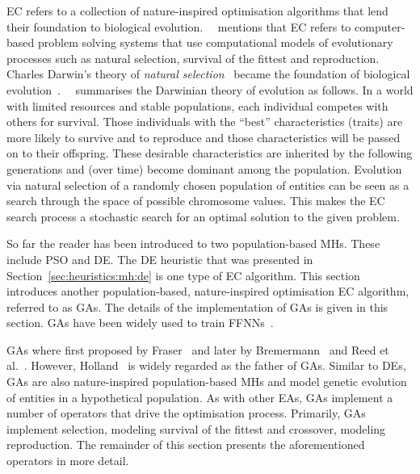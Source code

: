 \Ac{EC} refers to a collection of nature-inspired optimisation algorithms that lend their foundation to biological evolution.~\citeauthor{ref:engelbrecht:2007}~\cite{ref:engelbrecht:2007} mentions that \acs{EC} refers to computer-based problem solving systems that use computational models of evolutionary processes such as natural selection, survival of the fittest and reproduction. Charles Darwin's theory of \textit{natural selection}~\cite{ref:darwin:2012} became the foundation of biological evolution~\cite{ref:darwin:1987}.~\citeauthor{ref:engelbrecht:2007}~\cite{ref:engelbrecht:2007} summarises the Darwinian theory of evolution as follows. In a world with limited resources and stable populations, each individual competes with others for survival. Those individuals with the ``best'' characteristics (traits) are more likely to survive and to reproduce and those characteristics will be passed on to their offspring. These desirable characteristics are inherited by the following generations and (over time) become dominant among the population. Evolution via natural selection of a randomly chosen population of entities can be seen as a search through the space of possible chromosome values. This makes the \acs{EC} search process a stochastic search for an optimal solution to the given problem.

So far the reader has been introduced to two population-based \acp{MH}. These include \acs{PSO} and \acs{DE}. The \acs{DE} heuristic that was presented in Section~\ref{sec:heuristics:mh:de} is one type of \acs{EC} algorithm. This section introduces another population-based, nature-inspired optimisation \acs{EC} algorithm, referred to as \acfp{GA}. The details of the implementation of \acp{GA} is given in this section. \acp{GA} have been widely used to train \acp{FFNN}~\cite{ref:montana:1989, ref:siddique:2001, ref:miller:1989}.

\Acp{GA} where first proposed by Fraser~\cite{ref:fraser:1957} and later by Bremermann~\cite{ref:bremermann:1962} and Reed et al.~\cite{ref:reed:1967}. However, Holland~\cite{ref:holland:1992} is widely regarded as the father of \acp{GA}. Similar to \acp{DE}, \acp{GA} are also nature-inspired population-based \acp{MH} and model genetic evolution of entities in a hypothetical population. As with other \acp{EA}, \acp{GA} implement a number of operators that drive the optimisation process.  Primarily, \acp{GA} implement selection, modeling survival of the fittest and crossover, modeling reproduction. The remainder of this section presents the aforementioned operators in more detail.

